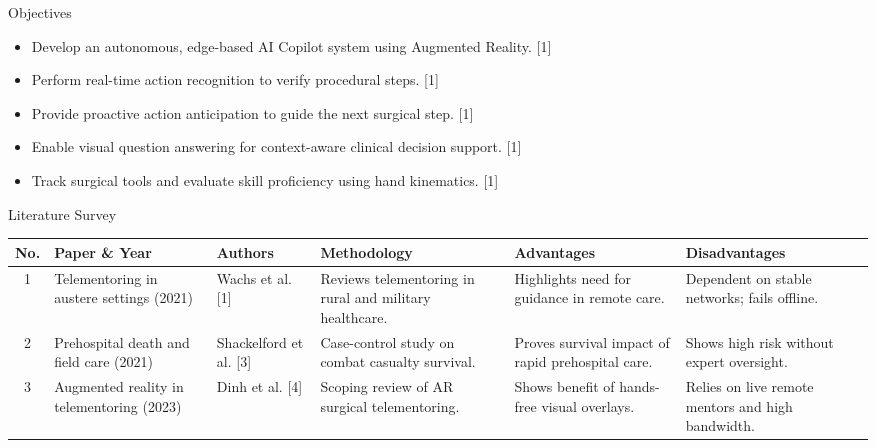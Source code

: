\documentclass[aspectratio=169, 10pt]{beamer}
\begin{document}
\begin{frame}{Objectives}
    \vspace{0.3cm}
    \begin{itemize}
        \setlength{\itemsep}{8pt}
        \item Develop an autonomous, edge-based AI Copilot system using Augmented Reality. [1]
        \item Perform real-time action recognition to verify procedural steps. [1]
        \item Provide proactive action anticipation to guide the next surgical step. [1]
        \item Enable visual question answering for context-aware clinical decision support. [1]
        \item Track surgical tools and evaluate skill proficiency using hand kinematics. [1]
    \end{itemize}
\end{frame}

\begin{frame}{Literature Survey}
    \vspace{0.15cm}
    \scriptsize
    \setlength{\tabcolsep}{3pt}
    \renewcommand{\arraystretch}{1.12}
    \begin{tabularx}{\textwidth}{|c|>{\raggedright\arraybackslash}p{2.3cm}|>{\raggedright\arraybackslash}p{1.5cm}|>{\raggedright\arraybackslash}X|>{\raggedright\arraybackslash}X|>{\raggedright\arraybackslash}X|}
        \hline
        \textbf{No.} & \textbf{Paper \& Year} & \textbf{Authors} & \textbf{Methodology} & \textbf{Advantages} & \textbf{Disadvantages} \\
        \hline
        1 & Telementoring in austere settings (2021) & Wachs et al. [1] & Reviews telementoring in rural and military healthcare. & Highlights need for guidance in remote care. & Dependent on stable networks; fails offline. \\
        \hline
        2 & Prehospital death and field care (2021) & Shackelford et al. [3] & Case-control study on combat casualty survival. & Proves survival impact of rapid prehospital care. & Shows high risk without expert oversight. \\
        \hline
        3 & Augmented reality in telementoring (2023) & Dinh et al. [4] & Scoping review of AR surgical telementoring. & Shows benefit of hands-free visual overlays. & Relies on live remote mentors and high bandwidth. \\
        \hline
    \end{tabularx}
\end{frame}
\end{document}
